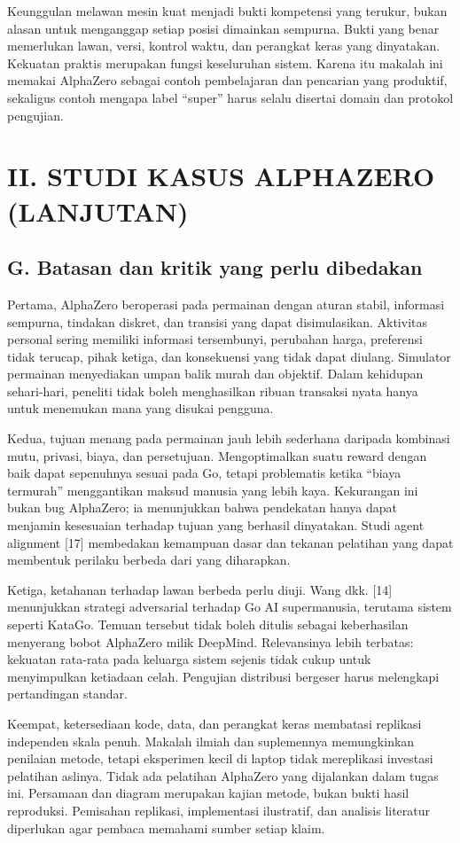 \documentclass[conference,a4paper]{IEEEtran}
\begin{document}
Keunggulan melawan mesin kuat menjadi bukti kompetensi yang terukur, bukan alasan untuk menganggap setiap posisi dimainkan sempurna. Bukti yang benar memerlukan lawan, versi, kontrol waktu, dan perangkat keras yang dinyatakan. Kekuatan praktis merupakan fungsi keseluruhan sistem. Karena itu makalah ini memakai AlphaZero sebagai contoh pembelajaran dan pencarian yang produktif, sekaligus contoh mengapa label ``super'' harus selalu disertai domain dan protokol pengujian.

\clearpage
\section*{II. STUDI KASUS ALPHAZERO (LANJUTAN)}
\subsection*{G. Batasan dan kritik yang perlu dibedakan}
Pertama, AlphaZero beroperasi pada permainan dengan aturan stabil, informasi sempurna, tindakan diskret, dan transisi yang dapat disimulasikan. Aktivitas personal sering memiliki informasi tersembunyi, perubahan harga, preferensi tidak terucap, pihak ketiga, dan konsekuensi yang tidak dapat diulang. Simulator permainan menyediakan umpan balik murah dan objektif. Dalam kehidupan sehari-hari, peneliti tidak boleh menghasilkan ribuan transaksi nyata hanya untuk menemukan mana yang disukai pengguna.

Kedua, tujuan menang pada permainan jauh lebih sederhana daripada kombinasi mutu, privasi, biaya, dan persetujuan. Mengoptimalkan suatu reward dengan baik dapat sepenuhnya sesuai pada Go, tetapi problematis ketika ``biaya termurah'' menggantikan maksud manusia yang lebih kaya. Kekurangan ini bukan bug AlphaZero; ia menunjukkan bahwa pendekatan hanya dapat menjamin kesesuaian terhadap tujuan yang berhasil dinyatakan. Studi agent alignment [17] membedakan kemampuan dasar dan tekanan pelatihan yang dapat membentuk perilaku berbeda dari yang diharapkan.

Ketiga, ketahanan terhadap lawan berbeda perlu diuji. Wang dkk. [14] menunjukkan strategi adversarial terhadap Go AI supermanusia, terutama sistem seperti KataGo. Temuan tersebut tidak boleh ditulis sebagai keberhasilan menyerang bobot AlphaZero milik DeepMind. Relevansinya lebih terbatas: kekuatan rata-rata pada keluarga sistem sejenis tidak cukup untuk menyimpulkan ketiadaan celah. Pengujian distribusi bergeser harus melengkapi pertandingan standar.

Keempat, ketersediaan kode, data, dan perangkat keras membatasi replikasi independen skala penuh. Makalah ilmiah dan suplemennya memungkinkan penilaian metode, tetapi eksperimen kecil di laptop tidak mereplikasi investasi pelatihan aslinya. Tidak ada pelatihan AlphaZero yang dijalankan dalam tugas ini. Persamaan dan diagram merupakan kajian metode, bukan bukti hasil reproduksi. Pemisahan replikasi, implementasi ilustratif, dan analisis literatur diperlukan agar pembaca memahami sumber setiap klaim.
\end{document}
